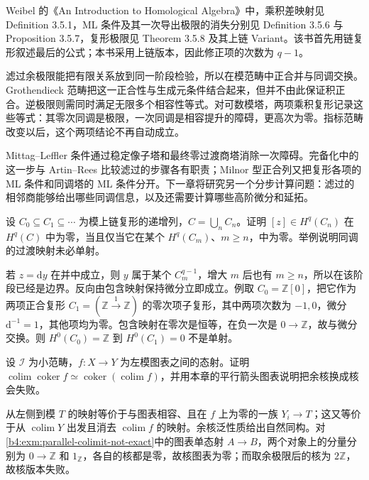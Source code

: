 \ProseParagraphBreak
Weibel 的《An Introduction to Homological Algebra》\cite[Section 3.5]{Weibel1994HomologicalAlgebra}中，乘积差映射见 Definition 3.5.1，ML 条件及其一次导出极限的消失分别见 Definition 3.5.6 与 Proposition 3.5.7，复形极限见 Theorem 3.5.8 及其上链 Variant。该书首先用链复形叙述最后的公式；本书采用上链版本，因此修正项的次数为 \(q-1\)。






\begin{chaptersummary}
	滤过余极限能把有限关系放到同一阶段检验，所以在模范畴中正合并与同调交换。Grothendieck 范畴把这一正合性与生成元条件结合起来，但并不由此保证积正合。逆极限则需同时满足无限多个相容性等式。对可数模塔，两项乘积复形记录这些等式：其零次同调是极限，一次同调是相容提升的障碍，更高次为零。指标范畴改变以后，这个两项结论不再自动成立。

	\ProseParagraphBreak
	Mittag–Leffler 条件通过稳定像子塔和最终零过渡商塔消除一次障碍。完备化中的这一步与 Artin–Rees 比较滤过的步骤各有职责；Milnor 型正合列又把复形各项的 ML 条件和同调塔的 ML 条件分开。下一章将研究另一个分步计算问题：滤过的相邻商能够给出哪些同调信息，以及还需要计算哪些高阶微分和延拓。
\end{chaptersummary}

\BookExercises

\begin{exercise}\label{b4:ex:13-colimit-cycles}
	设 \(C_0\subseteq C_1\subseteq\cdots\) 为模上链复形的递增列，\(C=\bigcup_nC_n\)。证明 \([z]\in H^q(C_n)\) 在 \(H^q(C)\) 中为零，当且仅当它在某个 \(H^q(C_m)\)、\(m\ge n\)，中为零。举例说明同调的过渡映射未必单射。
\end{exercise}
\begin{solution}
	若 \(z=\mathrm{d}y\) 在并中成立，则 \(y\) 属于某个 \(C_m^{q-1}\)，增大 \(m\) 后也有 \(m\ge n\)，所以在该阶段已经是边界。反向由包含映射保持微分立即成立。例取 \(C_0=\mathbb Z[0]\)，把它作为两项正合复形 \(C_1=(\mathbb Z\xrightarrow{1}\mathbb Z)\) 的零次项子复形，其中两项次数为 \(-1,0\)，微分 \(\mathrm d^{-1}=1\)，其他项均为零。包含映射在零次是恒等，在负一次是 \(0\to\mathbb Z\)，故与微分交换。则 \(H^0(C_0)=\mathbb Z\) 到 \(H^0(C_1)=0\) 不是单射。
\end{solution}

\begin{exercise}\label{b4:ex:13-colimit-cokernel}
	设 \(\mathcal I\) 为小范畴，\(f:X\to Y\) 为左模图表之间的态射。证明 \(\operatorname{colim}\operatorname{coker}f\simeq\operatorname{coker}(\operatorname{colim}f)\)，并用本章的平行箭头图表说明把余核换成核会失败。
\end{exercise}
\begin{solution}
	从左侧到模 \(T\) 的映射等价于与图表相容、且在 \(f\) 上为零的一族 \(Y_i\to T\)；这又等价于从 \(\operatorname{colim}Y\) 出发且消去 \(\operatorname{colim}f\) 的映射。余核泛性质给出自然同构。对\cref{b4:exm:parallel-colimit-not-exact}中的图表单态射 \(A\to B\)，两个对象上的分量分别为 \(0\to\mathbb Z\) 和 \(1_{\mathbb Z}\)，各自的核都是零，故核图表为零；而取余极限后的核为 \(2\mathbb Z\)，故核版本失败。
\end{solution}

